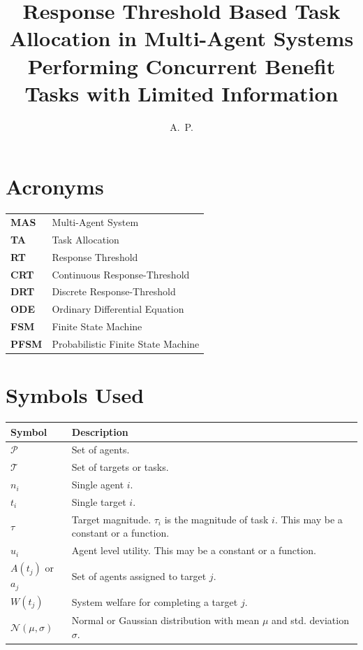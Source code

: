 \documentclass[defaultstyle,12pt]{thesis}
\title{Response Threshold Based Task Allocation in Multi-Agent Systems Performing Concurrent Benefit Tasks with Limited Information}
\author{A.~P.}{Kanakia}
\newcommand{\Pl}{\mathcal{P}} %
\newcommand{\Ta}{\mathcal{T}} %
\begin{document}
\begin{center}
\section*{Acronyms}
\begin{table}[!ht]
\centering\begin{tabular}{lp{8.5cm}}
	\textbf{MAS} & Multi-Agent System\\
	\textbf{TA} & Task Allocation\\
	\textbf{RT} & Response Threshold\\
	\textbf{CRT} & Continuous Response-Threshold\\
	\textbf{DRT} & Discrete Response-Threshold\\
	\textbf{ODE} & Ordinary Differential Equation\\
	\textbf{FSM} & Finite State Machine\\
	\textbf{PFSM} & Probabilistic Finite State Machine
\end{tabular}
\end{table}

\section*{Symbols Used}
\begin{table}[!ht]
\centering\begin{tabular}{lp{8.5cm}}
	\textbf{Symbol} & \textbf{Description}\\
	\hline
	$\Pl$ & Set of agents.\\
	$\Ta$ & Set of targets or tasks.\\
	$n_i$ & Single agent $i$.\\
	$t_i$ & Single target $i$.\\
	$\tau$ & Target magnitude. $\tau_i$ is the magnitude of task $i$. This may be a constant or a function.\\
	$u_i$ & Agent level utility. This may be a constant or a function.\\
	$A(t_j)$ or $a_j$ & Set of agents assigned to target $j$.\\
	$W(t_j)$ & System welfare for completing a target $j$.\\
	$\mathcal{N}(\mu, \sigma)$ & Normal or Gaussian distribution with mean $\mu$ and std. deviation $\sigma$.\\
\end{tabular}
\end{table}
\end{center}
\end{document}
